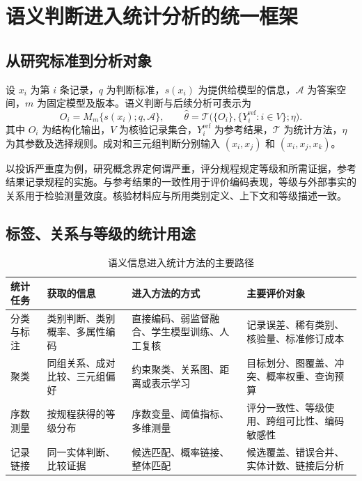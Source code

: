 \documentclass[UTF8,a4paper,zihao=-4,fontset=fandol]{ctexart}
\begin{document}
\section{语义判断进入统计分析的统一框架}\label{sec:framework}

\subsection{从研究标准到分析对象}

设 $x_i$ 为第 $i$ 条记录，$q$ 为判断标准，$s(x_i)$ 为提供给模型的信息，$\mathcal A$ 为答案空间，$m$ 为固定模型及版本。语义判断与后续分析可表示为
\begin{equation}
 O_i=M_m\{s(x_i);q,\mathcal A\},\qquad
 \widehat\theta=\mathcal T\bigl(\{O_i\},\{Y_i^{\mathrm{ref}}:i\in V\};\eta\bigr).
 \label{eq:framework}
\end{equation}
其中 $O_i$ 为结构化输出，$V$ 为核验记录集合，$Y_i^{\mathrm{ref}}$ 为参考结果，$\mathcal T$ 为统计方法，$\eta$ 为其参数及选择规则。成对和三元组判断分别输入 $(x_i,x_j)$ 和 $(x_i,x_j,x_k)$。

以投诉严重度为例，研究概念界定何谓严重，评分规程规定等级和所需证据，参考结果记录规程的实施。与参考结果的一致性用于评价编码表现，等级与外部事实的关系用于检验测量效度\citep{grimmer2013}。核验材料应与所用类别定义、上下文和等级描述一致。

\subsection{标签、关系与等级的统计用途}

\begin{table}[htbp]
\centering\small
\caption{语义信息进入统计方法的主要路径}\label{tab:framework}
\begin{tabularx}{\textwidth}{@{}L{1.7cm}L{2.7cm}YY@{}}
\toprule
统计任务 & 获取的信息 & 进入方法的方式 & 主要评价对象 \\
\midrule
分类与标注 & 类别判断、类别概率、多属性编码 & 直接编码、弱监督融合、学生模型训练、人工复核 & 记录误差、稀有类别、核验量、标准修订成本 \\
聚类 & 同组关系、成对比较、三元组偏好 & 约束聚类、关系图、距离或表示学习 & 目标划分、图覆盖、冲突、概率权重、查询预算 \\
序数测量 & 按规程获得的等级分布 & 序数变量、阈值指标、多维测量 & 评分一致性、等级使用、跨组可比性、编码敏感性 \\
记录链接 & 同一实体判断、比较证据 & 候选匹配、概率链接、整体匹配 & 候选覆盖、错误合并、实体计数、链接后分析 \\
\bottomrule
\end{tabularx}
\end{table}
\end{document}

